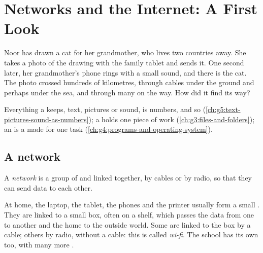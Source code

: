 \chapter{Networks and the Internet: A First Look}\label{ch:g5:networks-first-look}

Noor has drawn a cat for her grandmother, who lives two countries away. She
takes a photo of the drawing with the family tablet and sends it. One second
later, her grandmother's phone rings with a small sound, and there is the cat.
The photo crossed hundreds of kilometres, through cables under the ground and
perhaps under the sea, and through many  on the way. How did it find
its way?

\begin{recall}
Everything a  keeps, text, pictures or sound, is numbers, and so 
(\cref{ch:g5:text-pictures-sound-as-numbers}); a  holds one piece of work
(\cref{ch:g3:files-and-folders}); an  is a  made for one task
(\cref{ch:g4:programs-and-operating-system}).
\end{recall}

\section{A network}

\begin{definition}[Network]\label{def:g5:networks-first-look:network}
A \emph{network} is a group of  and  linked
together, by cables or by radio, so that they can send data to each other.
\end{definition}

At home, the laptop, the tablet, the phones and the printer usually form a
small . They are linked to a small box, often on a shelf, which passes
the data from one  to another and  the home  to the outside
world. Some  are linked to the box by a cable; others by radio, without
a cable: this is called \emph{wi-fi}. The school has its own  too, with
many more .

